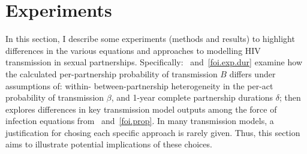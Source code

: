 \section{Experiments}\label{foi.exp}
In this section, I describe some experiments (methods and results) to
highlight differences in the various equations and approaches
to modelling HIV transmission in sexual partnerships.
Specifically:
~and~\ref{foi.exp.dur} examine how
the calculated per-partnership probability of transmission $B$ differs under assumptions of:
within- \vs between-partnership heterogeneity in the per-act probability of transmission $\beta$,
and 1-year \vs complete partnership durations $\delta$; then
 explores differences in key transmission model outputs
among the force of infection equations from ~and~\ref{foi.prop}.
In many transmission models,
a justification for chosing each specific approach is rarely given.
Thus, this section aims to illustrate potential implications of these choices.
